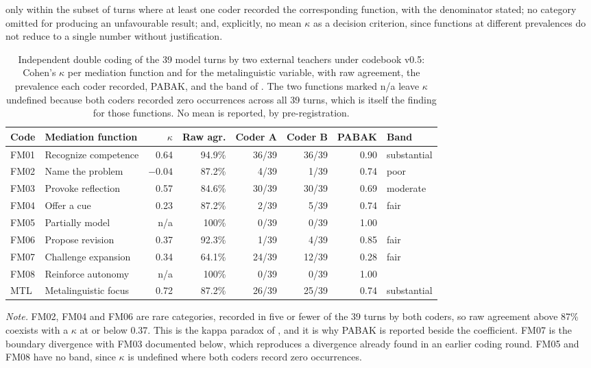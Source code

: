 \documentclass{sbc2023}%
\begin{document}
only within the subset of turns where at least one coder recorded the corresponding function, with the denominator stated; no category omitted for producing an unfavourable result; and, explicitly, no mean $\kappa$ as a decision criterion, since functions at different prevalences do not reduce to a single number without justification.

\begin{table}[!t]
\caption{Independent double coding of the 39 model turns by two external teachers under codebook v0.5: Cohen's $\kappa$ per mediation function and for the metalinguistic variable, with raw agreement, the prevalence each coder recorded, PABAK, and the band of \citet{landis1977measurement}. The two functions marked n/a leave $\kappa$ undefined because both coders recorded zero occurrences across all 39 turns, which is itself the finding for those functions. No mean is reported, by pre-registration.}
\centering
\footnotesize
\begin{tabular}{@{}llrrrrrl@{}}
\hline\hline
Code & Mediation function & $\kappa$ & Raw agr. & Coder A & Coder B & PABAK & Band \\
\hline
FM01 & Recognize competence & 0.64 & 94.9\% & 36/39 & 36/39 & 0.90 & substantial \\
FM02 & Name the problem & $-0.04$ & 87.2\% & 4/39 & 1/39 & 0.74 & poor \\
FM03 & Provoke reflection & 0.57 & 84.6\% & 30/39 & 30/39 & 0.69 & moderate \\
FM04 & Offer a cue & 0.23 & 87.2\% & 2/39 & 5/39 & 0.74 & fair \\
FM05 & Partially model & n/a & 100\% & 0/39 & 0/39 & 1.00 & \\
FM06 & Propose revision & 0.37 & 92.3\% & 1/39 & 4/39 & 0.85 & fair \\
FM07 & Challenge expansion & 0.34 & 64.1\% & 24/39 & 12/39 & 0.28 & fair \\
FM08 & Reinforce autonomy & n/a & 100\% & 0/39 & 0/39 & 1.00 & \\
\hline
MTL & Metalinguistic focus & 0.72 & 87.2\% & 26/39 & 25/39 & 0.74 & substantial \\
\hline\hline
\end{tabular}
\label{tab:fm-kappa-model}
\end{table}

\noindent\textit{Note.} FM02, FM04 and FM06 are rare categories, recorded in five or fewer of the 39 turns by both coders, so raw agreement above 87\% coexists with a $\kappa$ at or below 0.37. This is the kappa paradox of \citet{feinstein1990high}, and it is why PABAK is reported beside the coefficient. FM07 is the boundary divergence with FM03 documented below, which reproduces a divergence already found in an earlier coding round. FM05 and FM08 have no band, since $\kappa$ is undefined where both coders record zero occurrences.
\end{document}
